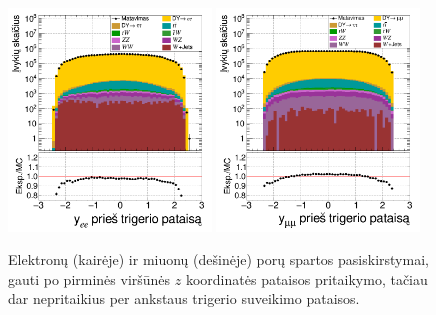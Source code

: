 \documentclass[a4paper, 12pt, twoside]{article}
\begin{document}
\begin{figure}[tbp]
	\includegraphics[width=0.48\textwidth]{ee_rapi_beforeL1.png}
	\includegraphics[width=0.48\textwidth]{mumu_rapi_beforeL1.png}
	\caption{\label{fig:rapibL1} Elektronų (kairėje) ir miuonų (dešinėje) porų spartos pasiskirstymai,
		gauti po pirminės viršūnės $z$ koordinatės pataisos pritaikymo, tačiau dar nepritaikius per ankstaus
		trigerio suveikimo pataisos.}
\end{figure}
\end{document}
